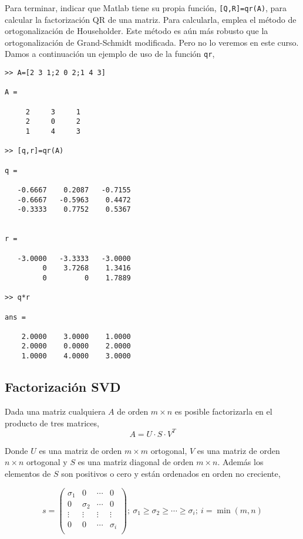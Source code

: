 Para terminar, indicar que Matlab tiene su propia función, \texttt{[Q,R]=qr(A)}, para calcular la factorización QR de una matriz. Para calcularla, emplea el método de ortogonalización de Householder. Este método es aún más robusto que la ortogonalización de Grand-Schmidt modificada. Pero no lo veremos en este curso. Damos a continuación un ejemplo de uso de la función \texttt{qr},
\begin{verbatim}
>> A=[2 3 1;2 0 2;1 4 3]

A =

     2     3     1
     2     0     2
     1     4     3

>> [q,r]=qr(A)

q =

   -0.6667    0.2087   -0.7155
   -0.6667   -0.5963    0.4472
   -0.3333    0.7752    0.5367


r =

   -3.0000   -3.3333   -3.0000
         0    3.7268    1.3416
         0         0    1.7889

>> q*r

ans =

    2.0000    3.0000    1.0000
    2.0000    0.0000    2.0000
    1.0000    4.0000    3.0000

\end{verbatim}
  
\subsection{Factorización SVD}\label{sec:SVD}
Dada una matriz cualquiera $A$ de orden $m\times n$ es posible factorizarla en el producto de tres matrices,
\begin{equation*}
A=U\cdot S \cdot V^T 
\end{equation*}

Donde $U$ es una matriz de orden $m\times m$ ortogonal, $V$ es una matriz de orden $n\times n$ ortogonal y $S$ es una matriz diagonal de orden $m\times n$. Además los elementos de $S$ son positivos o cero y están ordenados en orden no creciente,

\begin{equation*}
s=\begin{pmatrix}
\sigma_1& 0& \cdots & 0\\
0 & \sigma_2& \cdots & 0\\
\vdots & \vdots & \vdots & \vdots \\
0& 0& \cdots & \sigma_i\\ 
\end{pmatrix}; \ \sigma_1 \geq \sigma_2 \geq \cdots \geq \sigma_i; \ i=\min(m,n)
\end{equation*}

